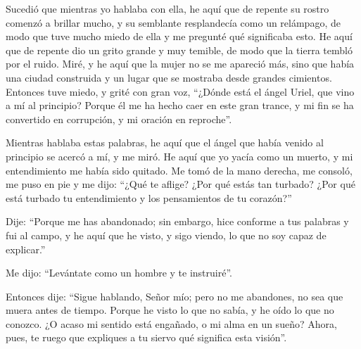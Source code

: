  Sucedió que mientras yo hablaba con ella, he aquí que de
repente su rostro comenzó a brillar mucho, y su semblante resplandecía
como un relámpago, de modo que tuve mucho miedo de ella y me pregunté
qué significaba esto.  He aquí que de repente dio un
grito grande y muy temible, de modo que la tierra tembló por el ruido.
 Miré, y he aquí que la mujer no se me apareció más, sino
que había una ciudad construida y un lugar que se mostraba desde grandes
cimientos. Entonces tuve miedo, y grité con gran voz, 
``¿Dónde está el ángel Uriel, que vino a mí al principio? Porque él me
ha hecho caer en este gran trance, y mi fin se ha convertido en
corrupción, y mi oración en reproche''.

 Mientras hablaba estas palabras, he aquí que el ángel
que había venido al principio se acercó a mí, y me miró. 
He aquí que yo yacía como un muerto, y mi entendimiento me había sido
quitado. Me tomó de la mano derecha, me consoló, me puso en pie y me
dijo:  ``¿Qué te aflige? ¿Por qué estás tan turbado? ¿Por
qué está turbado tu entendimiento y los pensamientos de tu corazón?''

 Dije: ``Porque me has abandonado; sin embargo, hice
conforme a tus palabras y fui al campo, y he aquí que he visto, y sigo
viendo, lo que no soy capaz de explicar.''

 Me dijo: ``Levántate como un hombre y te instruiré''.

 Entonces dije: ``Sigue hablando, Señor mío; pero no me
abandones, no sea que muera antes de tiempo.  Porque he
visto lo que no sabía, y he oído lo que no conozco.  ¿O
acaso mi sentido está engañado, o mi alma en un sueño? 
Ahora, pues, te ruego que expliques a tu siervo qué significa esta
visión''.

